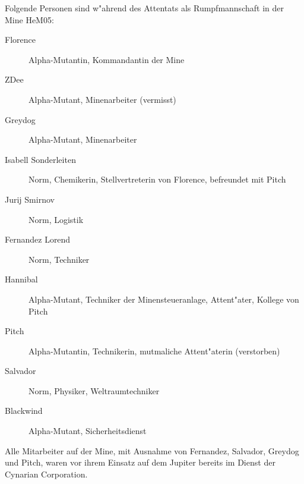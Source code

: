 
Folgende Personen sind w"ahrend des Attentats als Rumpfmannschaft in der Mine HeM05:

\begin{description}
    \item[Florence] Alpha-Mutantin, Kommandantin der Mine
    \item[ZDee] Alpha-Mutant, Minenarbeiter (vermisst)
    \item[Greydog] Alpha-Mutant, Minenarbeiter
    \item[Isabell Sonderleiten]Norm, Chemikerin, Stellvertreterin von Florence, befreundet mit Pitch
    \item[Jurij Smirnov] Norm, Logistik
    \item[Fernandez Lorend] Norm, Techniker
    \item[Hannibal] Alpha-Mutant, Techniker der Minensteueranlage, Attent"ater, Kollege von Pitch
    \item[Pitch] Alpha-Mutantin, Technikerin, mutma\3liche Attent"aterin (verstorben)
    \item[Salvador] Norm, Physiker, Weltraumtechniker
    \item[Blackwind] Alpha-Mutant, Sicherheitsdienst
\end{description}

Alle Mitarbeiter auf der Mine, mit Ausnahme von Fernandez, Salvador, Greydog und Pitch, waren vor ihrem Einsatz auf dem Jupiter bereits im Dienst der Cynarian Corporation.
